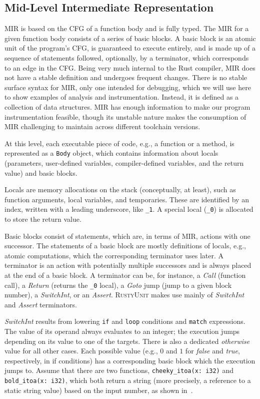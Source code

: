 \documentclass[paper=a4,%
  twoside,%
  BCOR4mm,%
  abstract=true,%
  toc=bibliography,%
  chapterprefix=true,%
  toc=bibliographynumbered,%
  open=right,%
  english,%
  pagesize=pdftex]{scrreprt}
\newcommand{\tech}{\textsc{RustyUnit}\xspace}
\newcommand{\mir}{\ac{MIR}\xspace}
\newcommand{\cfg}{\ac{CFG}\xspace}
\begin{document}
\subsection{Mid-Level Intermediate Representation}
\mir is based on the \cfg of a function body and is fully typed. The \mir for a given function body consists of a series of basic blocks. A basic block is an atomic unit of the program's \cfg, is guaranteed to execute entirely, and is made up of a sequence of statements followed, optionally, by a terminator, which corresponds to an edge in the \cfg. Being very much internal to the Rust compiler, \mir does not have a stable definition and undergoes frequent changes. There is no stable surface syntax for \mir, only one intended for debugging, which we will use here to show examples of analysis and instrumentation. Instead, it is defined as a collection of data structures. \mir has enough information to make our program instrumentation feasible, though its unstable nature makes the consumption of \mir challenging to maintain across different toolchain versions.

At this level, each executable piece of code, e.g., a function or a method, is represented as a \texttt{Body} object, which contains information about locals (parameters, user-defined variables, compiler-defined variables, and the return value) and basic blocks.

Locals are memory allocations on the stack (conceptually, at least), such as function arguments, local variables, and temporaries. These are identified by an index, written with a leading underscore, like \texttt{\string_1}. A special local (\texttt{\string_0}) is allocated to store the return value. 

Basic blocks consist of statements, which are, in terms of \mir, actions with one successor. The statements of a basic block are mostly definitions of locals, e.g., atomic computations, which the corresponding terminator uses later. A terminator is an action with potentially multiple successors and is always placed at the end of a basic block. A terminator can be, for instance, a \emph{Call} (function call), a \emph{Return} (returns the \texttt{\string_0} local), a \emph{Goto} jump (jump to a given block number), a \emph{SwitchInt}, or an \emph{Assert}. \tech makes use mainly of \emph{SwitchInt} and \emph{Assert} terminators. 

\emph{SwitchInt} results from lowering \texttt{if} and \texttt{loop} conditions and \texttt{match} expressions. The value of its operand always evaluates to an integer; the execution jumps depending on its value to one of the targets. There is also a dedicated \emph{otherwise} value for all other cases. Each possible value (e.g., $0$ and $1$ for \emph{false} and \emph{true}, respectively, in if conditions) has a corresponding basic block which the execution jumps to. Assume that there are two functions, \texttt{cheeky\string_itoa(x: i32)} and \texttt{bold\string_itoa(x: i32)}, which both return a string (more precisely, a reference to a static string value) based on the input number, as shown in~.
\end{document}
